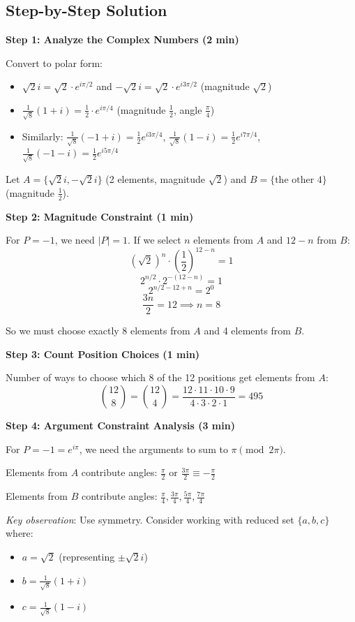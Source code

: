 \documentclass[]{article}
\begin{document}
\begin{solutionbox}
\subsection*{Step-by-Step Solution}

\textbf{Step 1: Analyze the Complex Numbers (2 min)}

Convert to polar form:
\begin{itemize}
    \item $\sqrt{2}i = \sqrt{2} \cdot e^{i\pi/2}$ and $-\sqrt{2}i = \sqrt{2} \cdot e^{i3\pi/2}$ (magnitude $\sqrt{2}$)
    \item $\frac{1}{\sqrt{8}}(1+i) = \frac{1}{2} \cdot e^{i\pi/4}$ (magnitude $\frac{1}{2}$, angle $\frac{\pi}{4}$)
    \item Similarly: $\frac{1}{\sqrt{8}}(-1+i) = \frac{1}{2} e^{i3\pi/4}$, $\frac{1}{\sqrt{8}}(1-i) = \frac{1}{2} e^{i7\pi/4}$, $\frac{1}{\sqrt{8}}(-1-i) = \frac{1}{2} e^{i5\pi/4}$
\end{itemize}

Let $A = \{\sqrt{2}i, -\sqrt{2}i\}$ (2 elements, magnitude $\sqrt{2}$) and $B = \{\text{the other 4}\}$ (magnitude $\frac{1}{2}$).

\textbf{Step 2: Magnitude Constraint (1 min)}

For $P = -1$, we need $|P| = 1$. If we select $n$ elements from $A$ and $12-n$ from $B$:
\[(\sqrt{2})^n \cdot \left(\frac{1}{2}\right)^{12-n} = 1\]
\[2^{n/2} \cdot 2^{-(12-n)} = 1\]
\[2^{n/2 - 12 + n} = 2^0\]
\[\frac{3n}{2} = 12 \implies n = 8\]

So we must choose exactly 8 elements from $A$ and 4 elements from $B$.

\textbf{Step 3: Count Position Choices (1 min)}

Number of ways to choose which 8 of the 12 positions get elements from $A$:
\[\binom{12}{8} = \binom{12}{4} = \frac{12 \cdot 11 \cdot 10 \cdot 9}{4 \cdot 3 \cdot 2 \cdot 1} = 495\]

\textbf{Step 4: Argument Constraint Analysis (3 min)}

For $P = -1 = e^{i\pi}$, we need the arguments to sum to $\pi \pmod{2\pi}$.

Elements from $A$ contribute angles: $\frac{\pi}{2}$ or $\frac{3\pi}{2} \equiv -\frac{\pi}{2}$

Elements from $B$ contribute angles: $\frac{\pi}{4}, \frac{3\pi}{4}, \frac{5\pi}{4}, \frac{7\pi}{4}$

\textit{Key observation}: Use symmetry. Consider working with reduced set $\{a, b, c\}$ where:
\begin{itemize}
    \item $a = \sqrt{2}$ (representing $\pm\sqrt{2}i$)
    \item $b = \frac{1}{\sqrt{8}}(1+i)$
    \item $c = \frac{1}{\sqrt{8}}(1-i)$
\end{itemize}


\end{solutionbox}
\end{document}
